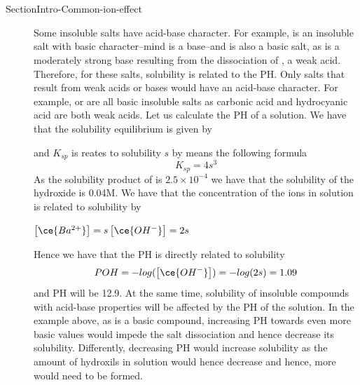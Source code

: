 \documentclass[main.tex]{subfiles}
\begin{document}
\section{} {SectionIntro-Common-ion-effect}
\sloppy\begin{description}
\item[] Some insoluble salts have acid-base character. For example,  is an insoluble salt with basic character--mind  is a base--and  is also a basic salt, as  is a moderately strong base resulting from the dissociation of , a weak acid. Therefore, for these salts, solubility is related to the PH. Only salts that result from weak acids or bases would have an acid-base character. For example,  or  are all basic insoluble salts as carbonic acid and hydrocyanic acid are both weak acids. Let us calculate the PH of a  solution. We have that the solubility equilibrium is given by
\begin{center}	\end{center}
and $K_{sp}$ is reates to solubility $s$ by means the following formula
\[K_{sp}=4s^3			\]
As the solubility product of   is $2.5\times10^{-4}$ we have that the solubility of the hydroxide is  0.04M. We have that the concentration of the ions in solution is related to solubility by
\begin{center}$\big[ \ce{Ba^{2+}}\big]=s$\hfill$\big[ \ce{OH^{-}}\big]=2s$\end{center}
Hence we have that the PH is directly related to solubility
\[POH=-log (\big[ \ce{OH^{-}}\big])=-log(2s)=1.09			\]
and PH will be 12.9.
At the same time, solubility of insoluble compounds with acid-base properties will be affected by the PH of the solution. In the example above, as  is a basic compound,  increasing PH towards even more basic values would impede the salt dissociation and hence decrease its solubility. Differently, decreasing PH would increase solubility as the amount of hydroxils in solution would hence decrease and hence, more would need to be formed. 



\end{description}
\end{document}
